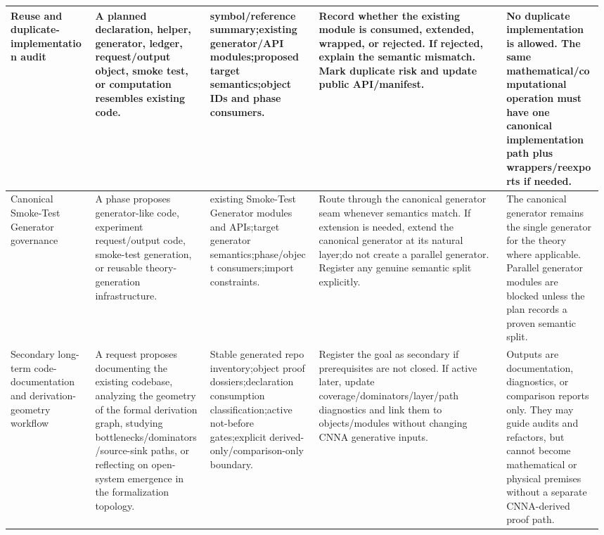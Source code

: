 \begin{longtable}{L{0.14\linewidth} L{0.19\linewidth} L{0.18\linewidth} L{0.31\linewidth} L{0.16\linewidth}}
\hline
\addlinespace[0.24em]
Reuse and duplicate-implementation audit & A planned declaration, helper, generator, ledger, request/\allowbreak{}output object, smoke test, or computation resembles existing code. & symbol/\allowbreak{}reference summary;\newline existing generator/\allowbreak{}API modules;\newline proposed target semantics;\newline object IDs and phase consumers. & Record whether the existing module is consumed, extended, wrapped, or rejected. If rejected, explain the semantic mismatch. Mark duplicate risk and update public API/\allowbreak{}manifest. & No duplicate implementation is allowed. The same mathematical/\allowbreak{}computational operation must have one canonical implementation path plus wrappers/\allowbreak{}reexports if needed.\\
\hline
\addlinespace[0.24em]
Canonical Smoke-Test Generator governance & A phase proposes generator-like code, experiment request/\allowbreak{}output code, smoke-test generation, or reusable theory-generation infrastructure. & existing Smoke-Test Generator modules and APIs;\newline target generator semantics;\newline phase/\allowbreak{}object consumers;\newline import constraints. & Route through the canonical generator seam whenever semantics match. If extension is needed, extend the canonical generator at its natural layer;\newline do not create a parallel generator. Register any genuine semantic split explicitly. & The canonical generator remains the single generator for the theory where applicable. Parallel generator modules are blocked unless the plan records a proven semantic split.\\
\hline
\addlinespace[0.24em]
Secondary long-term code-documentation and derivation-geometry workflow & A request proposes documenting the existing codebase, analyzing the geometry of the formal derivation graph, studying bottlenecks/\allowbreak{}dominators/\allowbreak{}source-sink paths, or reflecting on open-system emergence in the formalization topology. & Stable generated repo inventory;\newline object proof dossiers;\newline declaration consumption classification;\newline active not-before gates;\newline explicit derived-only/\allowbreak{}comparison-only boundary. & Register the goal as secondary if prerequisites are not closed. If active later, update coverage/\allowbreak{}dominators/\allowbreak{}layer/\allowbreak{}path diagnostics and link them to objects/\allowbreak{}modules without changing CNNA generative inputs. & Outputs are documentation, diagnostics, or comparison reports only. They may guide audits and refactors, but cannot become mathematical or physical premises without a separate CNNA-derived proof path.\\

\end{longtable}
